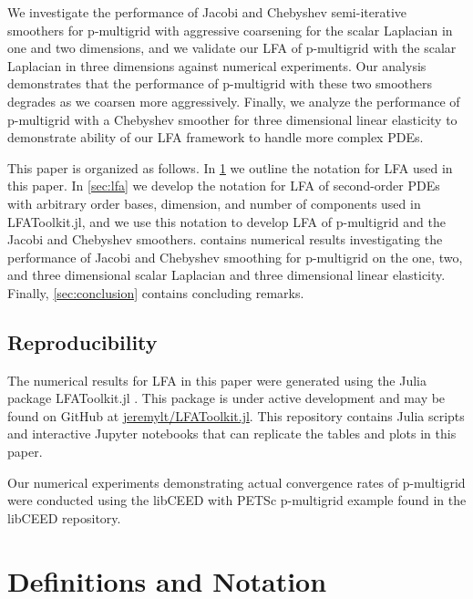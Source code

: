 \documentclass[review]{siamart190516}
\begin{document}
We investigate the performance of Jacobi and Chebyshev semi-iterative smoothers for p-multigrid with aggressive coarsening for the scalar Laplacian in one and two dimensions, and we validate our LFA of p-multigrid with the scalar Laplacian in three dimensions against numerical experiments.
Our analysis demonstrates that the performance of p-multigrid with these two smoothers degrades as we coarsen more aggressively.
Finally, we analyze the performance of p-multigrid with a Chebyshev smoother for three dimensional linear elasticity to demonstrate ability of our LFA framework to handle more complex PDEs.

This paper is organized as follows.
In \cref{sec:notation} we outline the notation for LFA used in this paper.
In \cref{sec:lfa} we develop the notation for LFA of second-order PDEs with arbitrary order bases, dimension, and number of components used in LFAToolkit.jl, and we use this notation to develop LFA of p-multigrid and the Jacobi and Chebyshev smoothers.
 contains numerical results investigating the performance of Jacobi and Chebyshev smoothing for p-multigrid on the one, two, and three dimensional scalar Laplacian and three dimensional linear elasticity.
Finally, \cref{sec:conclusion} contains concluding remarks.

\subsection{Reproducibility}\label{sec:reproducibility}

The numerical results for LFA in this paper were generated using the Julia package LFAToolkit.jl \cite{thompson2021toolkit}.
This package is under active development and may be found on GitHub at \href{https://github.com/jeremylt/LFAToolkit.jl}{jeremylt/LFAToolkit.jl}.
This repository contains Julia scripts and interactive Jupyter notebooks that can replicate the tables and plots in this paper.

Our numerical experiments demonstrating actual convergence rates of p-multigrid were conducted using the libCEED \cite{libceed-user-manual} with PETSc \cite{petsc-user-ref} p-multigrid example found in the libCEED repository.

\section{Definitions and Notation}\label{sec:notation}
\end{document}
